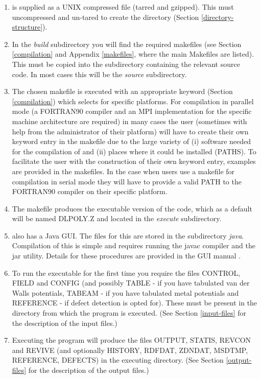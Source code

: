 \begin{enumerate}
\item \D is supplied as a UNIX compressed file (tarred and
gzipped).  This must uncompressed and un-tared to create the \D
directory (Section \ref{directory-structure}).

\item In the {\em build} subdirectory you will find the required
\D makefiles (see Section \ref{compilation} and Appendix
\ref{makefiles}, where the main Makefiles are listed).  This must be
copied into the subdirectory containing the relevant source code. In
most cases this will be the {\em source} subdirectory.

\item The chosen makefile is executed with an appropriate keyword
(Section \ref{compilation}) which selects for specific platforms.
For \D compilation in parallel mode (a FORTRAN90 compiler
and an MPI implementation for the specific machine architecture are
required) in many cases the user (sometimes with help from the
administrator of their platform) will have to create their own
keyword entry in the makefile due to the large variety of (i)
software needed for the compilation of \D and (ii) places where
it could be installed (PATHS).  To facilitate the user with the
construction of their own keyword entry, examples are provided
in the makefiles.  In the case when users use a makefile for \D
compilation in serial mode they will have to provide a valid
PATH to the FORTRAN90 compiler on their specific platform.

\item The makefile produces the executable version of the code,
which as a default will be named DLPOLY.Z and located in the {\em
execute} subdirectory.

\item \D also has a Java GUI.  The files for this are stored
in the subdirectory {\em java}.  Compilation of this is simple and
requires running the javac compiler and the jar utility.  Details
for these procedures are provided in the GUI manual \cite{smith-gui}.

\item To run the executable for the first time you require the files
CONTROL, FIELD and CONFIG (and possibly TABLE - if you have
tabulated van der Walls potentials, TABEAM - if you have
tabulated metal potentials and REFERENCE - if defect detection is opted
for).  These must be present in the directory from which the program
is executed. (See Section \ref{input-files} for the description of
the input files.)

\item Executing the program will produce the files OUTPUT, STATIS,
REVCON and REVIVE (and optionally HISTORY, RDFDAT, ZDNDAT, MSDTMP,
REFERENCE, DEFECTS) in the executing directory.
(See Section \ref{output-files} for the description of the output files.)
\end{enumerate}

